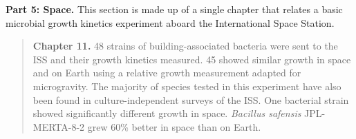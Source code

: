 \noindent\textbf{Part 5: Space.}
This section is made up of a single chapter that relates a basic microbial growth kinetics experiment aboard the International Space Station. 

\begin{quote}\noindent\textbf{Chapter 11.} 48 strains of building-associated
bacteria were sent to the ISS and their growth kinetics measured. 45 showed
similar growth in space and on Earth using a relative growth measurement
adapted for microgravity. The majority of species tested in this experiment
have also been found in culture-independent surveys of the ISS. One bacterial
strain showed significantly different growth in space. {\em Bacillus safensis}
JPL-MERTA-8-2 grew 60\% better in space than on Earth. \end{quote}

